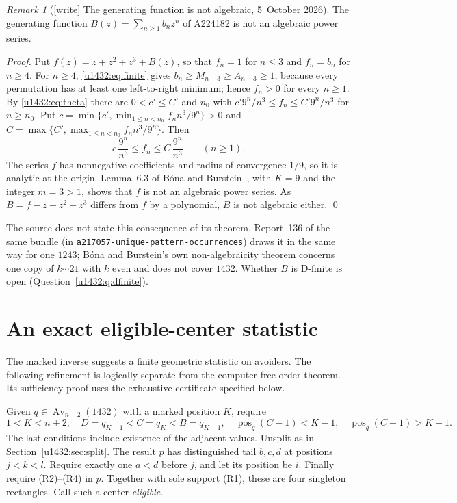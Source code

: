 \documentclass[11pt]{article}
\theoremstyle{remark}\newtheorem{remark}[theorem]{Remark}
\newcommand{\Av}{\operatorname{Av}}
\newcommand{\file}[1]{\nolinkurl{#1}}
\begin{document}
\begin{remark}[{[write]} The generating function is not algebraic, 5~October 2026]\label{u1432:rem:nonalg}
The generating function $B(z)=\sum_{n\ge1}b_nz^n$ of A224182 is not an
algebraic power series.

\emph{Proof.} Put $f(z)=z+z^2+z^3+B(z)$, so that $f_n=1$ for $n\le3$ and
$f_n=b_n$ for $n\ge4$. For $n\ge4$, \eqref{u1432:eq:finite} gives
$b_n\ge M_{n-3}\ge A_{n-3}\ge1$, because every permutation has at least one
left-to-right minimum; hence $f_n>0$ for every $n\ge1$. By
\eqref{u1432:eq:theta} there are $0<c'\le C'$ and $n_0$ with
$c'9^n/n^3\le f_n\le C'9^n/n^3$ for $n\ge n_0$. Put
$c=\min\{c',\min_{1\le n<n_0}f_nn^3/9^n\}>0$ and
$C=\max\{C',\max_{1\le n<n_0}f_nn^3/9^n\}$. Then
\[
 c\,\frac{9^n}{n^3}\le f_n\le C\,\frac{9^n}{n^3}\qquad(n\ge1).
\]
The series $f$ has nonnegative coefficients and radius of convergence $1/9$,
so it is analytic at the origin. Lemma~6.3 of B\'ona and
Burstein~\cite{BB}, with $K=9$ and the integer $m=3>1$, shows that $f$ is not
an algebraic power series. As $B=f-z-z^2-z^3$ differs from $f$ by a
polynomial, $B$ is not algebraic either. \qed

The source does not state this consequence of its theorem. Report~136 of the
same bundle (in \file{a217057-unique-pattern-occurrences}) draws it in the
same way for one $1243$; B\'ona and Burstein's own non-algebraicity theorem
concerns one copy of $k\cdots21$ with $k$ even and does not cover $1432$.
Whether $B$ is D-finite is open (Question~\ref{u1432:q:dfinite}).
\end{remark}

\section{An exact eligible-center statistic}\label{u1432:sec:image}
The marked inverse suggests a finite geometric statistic on avoiders.
The following refinement is logically separate from the computer-free
order theorem. Its sufficiency proof uses the exhaustive certificate
specified below.

Given $q\in\Av_{n+2}(1432)$ with a marked position $K$, require
\begin{equation}\label{u1432:eq:adjacency}
 1<K<n+2,\quad D=q_{K-1}<C=q_K<B=q_{K+1},\quad
 \operatorname{pos}_q(C-1)<K-1,\quad
 \operatorname{pos}_q(C+1)>K+1.
\end{equation}
The last conditions include existence of the adjacent values. Unsplit
as in Section~\ref{u1432:sec:split}. The result $p$ has distinguished tail
$b,c,d$ at positions $j<k<l$. Require exactly one $a<d$ before $j$,
and let its position be $i$. Finally require (R2)--(R4) in $p$.
Together with sole support (R1), these are four singleton rectangles.
Call such a center \emph{eligible}.
\end{document}

